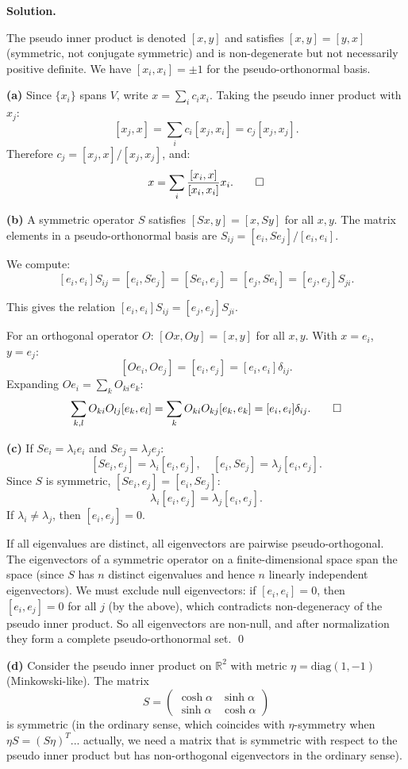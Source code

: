 \documentclass[12pt]{article}
\begin{document}
\bigskip
\textbf{Solution.}

The pseudo inner product is denoted $[x, y]$ and satisfies $[x, y] = [y, x]$ (symmetric, not conjugate symmetric) and is non-degenerate but not necessarily positive definite. We have $[x_i, x_i] = \pm 1$ for the pseudo-orthonormal basis.

\textbf{(a)} Since $\{x_i\}$ spans $V$, write $x = \sum_i c_i x_i$. Taking the pseudo inner product with $x_j$:
\[
[x_j, x] = \sum_i c_i [x_j, x_i] = c_j [x_j, x_j].
\]
Therefore $c_j = [x_j, x]/[x_j, x_j]$, and:
\[
x = \sum_i \frac{[x_i, x]}{[x_i, x_i]} x_i. \qed
\]

\textbf{(b)} A symmetric operator $S$ satisfies $[Sx, y] = [x, Sy]$ for all $x, y$. The matrix elements in a pseudo-orthonormal basis are $S_{ij} = [e_i, Se_j]/[e_i, e_i]$.

We compute:
\[
[e_i, e_i] S_{ij} = [e_i, Se_j] = [Se_i, e_j] = [e_j, Se_i] = [e_j, e_j] S_{ji}.
\]

This gives the relation $[e_i, e_i] S_{ij} = [e_j, e_j] S_{ji}$.

For an orthogonal operator $O$: $[Ox, Oy] = [x, y]$ for all $x, y$. With $x = e_i$, $y = e_j$:
\[
[Oe_i, Oe_j] = [e_i, e_j] = [e_i, e_i]\delta_{ij}.
\]
Expanding $Oe_i = \sum_k O_{ki} e_k$:
\[
\sum_{k,l} O_{ki} O_{lj} [e_k, e_l] = \sum_k O_{ki} O_{kj} [e_k, e_k] = [e_i, e_i]\delta_{ij}. \qed
\]

\textbf{(c)} If $Se_i = \lambda_i e_i$ and $Se_j = \lambda_j e_j$:
\[
[Se_i, e_j] = \lambda_i[e_i, e_j], \quad [e_i, Se_j] = \lambda_j[e_i, e_j].
\]
Since $S$ is symmetric, $[Se_i, e_j] = [e_i, Se_j]$:
\[
\lambda_i [e_i, e_j] = \lambda_j [e_i, e_j].
\]
If $\lambda_i \neq \lambda_j$, then $[e_i, e_j] = 0$. \checkmark

If all eigenvalues are distinct, all eigenvectors are pairwise pseudo-orthogonal. The eigenvectors of a symmetric operator on a finite-dimensional space span the space (since $S$ has $n$ distinct eigenvalues and hence $n$ linearly independent eigenvectors). We must exclude null eigenvectors: if $[e_i, e_i] = 0$, then $[e_i, e_j] = 0$ for all $j$ (by the above), which contradicts non-degeneracy of the pseudo inner product. So all eigenvectors are non-null, and after normalization they form a complete pseudo-orthonormal set. \qed

\textbf{(d)} Consider the pseudo inner product on $\mathbb{R}^2$ with metric $\eta = \text{diag}(1, -1)$ (Minkowski-like). The matrix
\[
S = \begin{pmatrix} \cosh\alpha & \sinh\alpha \\ \sinh\alpha & \cosh\alpha \end{pmatrix}
\]
is symmetric (in the ordinary sense, which coincides with $\eta$-symmetry when $\eta S = (S\eta)^T$... actually, we need a matrix that is symmetric with respect to the pseudo inner product but has non-orthogonal eigenvectors in the ordinary sense).
\end{document}
